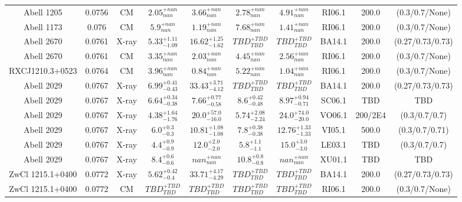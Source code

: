 \begin{table}
\begin{tabular}{cccccccccc}
Abell 1205 & 0.0756 & CM & ${2.05}^{+nan}_{nan}$ & ${3.66}^{+nan}_{nan}$ & ${2.78}^{+nan}_{nan}$ & ${4.91}^{+nan}_{nan}$ & RI06.1 & 200.0 & (0.3/0.7/None) \\
Abell 1173 & 0.076 & CM & ${5.9}^{+nan}_{nan}$ & ${1.19}^{+nan}_{nan}$ & ${7.68}^{+nan}_{nan}$ & ${1.41}^{+nan}_{nan}$ & RI06.1 & 200.0 & (0.3/0.7/None) \\
Abell 2670 & 0.0761 & X-ray & ${5.33}^{+1.11}_{-1.09}$ & ${16.62}^{+1.25}_{-1.62}$ & ${TBD}^{+TBD}_{TBD}$ & ${TBD}^{+TBD}_{TBD}$ & BA14.1 & 200.0 & (0.27/0.73/0.73) \\
Abell 2670 & 0.0761 & CM & ${3.35}^{+nan}_{nan}$ & ${2.03}^{+nan}_{nan}$ & ${4.45}^{+nan}_{nan}$ & ${2.56}^{+nan}_{nan}$ & RI06.1 & 200.0 & (0.3/0.7/None) \\
RXCJ1210.3+0523 & 0.0764 & CM & ${3.96}^{+nan}_{nan}$ & ${0.84}^{+nan}_{nan}$ & ${5.22}^{+nan}_{nan}$ & ${1.04}^{+nan}_{nan}$ & RI06.1 & 200.0 & (0.3/0.7/None) \\
Abell 2029 & 0.0767 & X-ray & ${6.99}^{+0.41}_{-0.43}$ & ${33.43}^{+3.71}_{-4.12}$ & ${TBD}^{+TBD}_{TBD}$ & ${TBD}^{+TBD}_{TBD}$ & BA14.1 & 200.0 & (0.27/0.73/0.73) \\
Abell 2029 & 0.0767 & X-ray & ${6.64}^{+0.34}_{-0.38}$ & ${7.66}^{+0.77}_{-0.58}$ & ${8.6}^{+0.42}_{-0.48}$ & ${8.97}^{+0.94}_{-0.71}$ & SC06.1 & TBD & TBD \\
Abell 2029 & 0.0767 & X-ray & ${4.38}^{+1.64}_{-1.76}$ & ${20.0}^{+57.0}_{-16.0}$ & ${5.74}^{+2.08}_{-2.24}$ & ${24.0}^{+74.0}_{-20.0}$ & VO06.1 & 200/2E4 & (0.3/0.7/0.7) \\
Abell 2029 & 0.0767 & X-ray & ${6.0}^{+0.3}_{-0.3}$ & ${10.81}^{+1.08}_{-1.08}$ & ${7.8}^{+0.38}_{-0.38}$ & ${12.76}^{+1.33}_{-1.33}$ & VI05.1 & 500.0 & (0.3/0.7/0.71) \\
Abell 2029 & 0.0767 & X-ray & ${4.4}^{+0.9}_{-0.9}$ & ${12.0}^{+2.0}_{-2.0}$ & ${5.8}^{+1.1}_{-1.1}$ & ${15.0}^{+3.0}_{-3.0}$ & LE03.1 & TBD & (0.3/0.7/0.7) \\
Abell 2029 & 0.0767 & X-ray & ${8.4}^{+0.6}_{-0.6}$ & ${nan}^{+nan}_{nan}$ & ${10.8}^{+0.8}_{-0.8}$ & ${nan}^{+nan}_{nan}$ & XU01.1 & TBD & TBD \\
ZwCl 1215.1+0400 & 0.0772 & X-ray & ${5.62}^{+0.42}_{-0.4}$ & ${33.71}^{+4.17}_{-4.29}$ & ${TBD}^{+TBD}_{TBD}$ & ${TBD}^{+TBD}_{TBD}$ & BA14.1 & 200.0 & (0.27/0.73/0.73) \\
ZwCl 1215.1+0400 & 0.0772 & CM & ${TBD}^{+TBD}_{TBD}$ & ${TBD}^{+TBD}_{TBD}$ & ${TBD}^{+TBD}_{TBD}$ & ${TBD}^{+TBD}_{TBD}$ & RI06.1 & 200.0 & (0.3/0.7/None) \\

\end{tabular}
\end{table}

